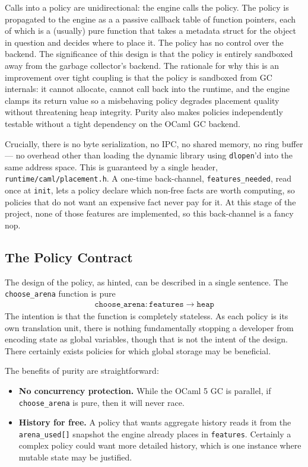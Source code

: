 \documentclass[sigconf]{acmart}
\begin{document}
Calls into a policy are unidirectional: the engine calls the policy. The policy is propagated to the engine as a a passive callback table of function pointers, each of which is a (usually) pure function that takes a metadata struct for the object in question and decides where to place it. The policy has no control over the backend. The significance of this design is that the policy is entirely sandboxed away from the garbage collector's backend. The rationale for why this is an improvement over tight coupling is that the policy is sandboxed from GC internals: it cannot allocate, cannot call back into the runtime, and the engine clamps its return value so a misbehaving policy degrades placement quality without threatening heap integrity. Purity also makes policies independently testable without a tight dependency on the OCaml GC backend.

Crucially, there is no byte serialization, no IPC, no shared memory, no ring buffer --- no overhead other than loading the dynamic library using \texttt{dlopen}'d into the same address space. This is guaranteed by a single header, \texttt{runtime/caml/placement.h}.
A one-time back-channel, \texttt{features\_needed}, read once at \texttt{init}, lets a policy declare which non-free facts are worth computing, so policies that do not want an
expensive fact never pay for it. At this stage of the project, none of those features are implemented, so this back-channel is a fancy nop.

\subsection{The Policy Contract}

The design of the policy, as hinted, can be described in a single sentence. The \texttt{choose\_arena} function is pure
\begin{align}
  \texttt{choose\_arena} : \texttt{features} \to \texttt{heap}
\end{align}
The intention is that the function is completely stateless. As each policy is its own translation unit, there is nothing fundamentally stopping
a developer from encoding state as global variables, though that is not the intent of the design. There certainly exists policies for which global storage may be beneficial.

The benefits of purity are straightforward:
\begin{itemize}
  \item \textbf{No concurrency protection.} While the OCaml 5 GC is parallel, if \texttt{choose\_arena} is pure, then it will never race.
  \item \textbf{History for free.} A policy that wants aggregate history reads it from the \texttt{arena\_used[]} snapshot the engine already places in
  \texttt{features}. Certainly a complex policy could want more detailed history, which is one instance where mutable state may be justified.
\end{itemize}
\end{document}
